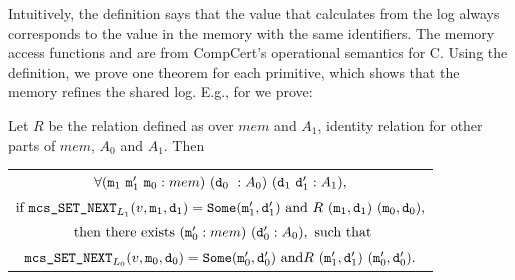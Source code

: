 Intuitively, the definition says that the value that
 calculates from the log always corresponds to the value 
in the memory with the same identifiers. The memory access functions  and  are
from CompCert's operational semantics for C.
Using the definition, we prove one theorem for each primitive, which
shows that the memory refines the shared log. E.g., for  we prove:

\begin{theorem}
    \label{thm:chapter:mcslock:machine-state-refinement} Let $R$ be the relation defined as 
    over $mem$ and $A_1$, 
identity relation for other parts of $mem$, $A_0$ and $A_1$. Then
 \begin{center}
 \begin{tabular}{c}
$ \forall (\codeinmath{{m}}_{1} \ \codeinmath{{m}}_{1}'\ \codeinmath{{m}}_{0} : mem)\  (\codeinmath{{d}}_{0} \ : A_0)\ (\codeinmath{{d}}_{1} \ \codeinmath{{d}}_{1}' : A_1),$ \\
$ \mbox{if } {\mathrm{\texttt{{mcs\_SET\_NEXT}}}}_{L_1}(v, {\mathrm{\texttt{{m}}}}_1, {\mathrm{\texttt{{d}}}}_1) = {\mathrm{\texttt{{Some}}}}({\mathrm{\texttt{{m}}}}'_1, {\mathrm{\texttt{{d}}}}'_1) \mbox{ and }
  R\ ({\mathrm{\texttt{{m}}}}_1, {\mathrm{\texttt{{d}}}}_1)\ ({\mathrm{\texttt{{m}}}}_0, {\mathrm{\texttt{{d}}}}_0),$\\
  $ \mbox{ then there exists } ({\mathrm{\texttt{{m}}}}_{0}' : mem)\ ({\mathrm{\texttt{{d}}}}_{0}' : A_0), \mbox{ such that}$\\
$  {\mathrm{\texttt{{mcs\_SET\_NEXT}}}}_{L_0}(v, {\mathrm{\texttt{{m}}}}_0, {\mathrm{\texttt{{d}}}}_0) = {\mathrm{\texttt{{Some}}}}({\mathrm{\texttt{{m}}}}'_0, {\mathrm{\texttt{{d}}}}'_0) \mbox{ and}
  R\ ({\mathrm{\texttt{{m}}}}'_1, {\mathrm{\texttt{{d}}}}'_1)\ ({\mathrm{\texttt{{m}}}}'_0, {\mathrm{\texttt{{d}}}}'_0).$ 
   \end{tabular}
 \end{center}
\end{theorem}


